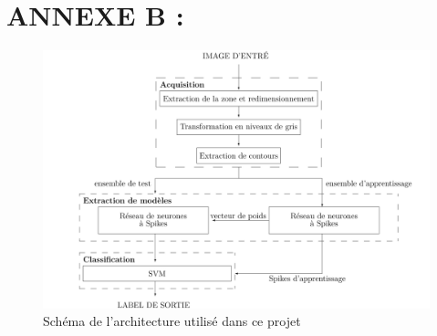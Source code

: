 \documentclass[12pt]{article}
\begin{document}
\thispagestyle{empty}
\pagebreak

\section*{ANNEXE B :}
\begin{figure}[h!]
\includegraphics[scale=0.3]{data/archi.png}
\caption{Schéma de l'architecture utilisé dans ce projet}
\label{archi}
\end{figure}

\thispagestyle{empty}
\pagebreak






\thispagestyle{empty}
\end{document}

